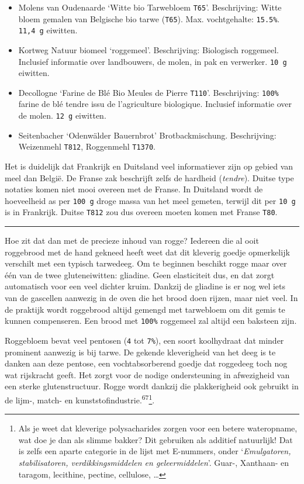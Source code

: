 \documentclass[
  11pt,
  dutch,
]{memoir}
\providecommand{\tightlist}{%
  \setlength{\itemsep}{0pt}\setlength{\parskip}{0pt}}
\begin{document}
\begin{itemize}
\tightlist
\item
  Molens van Oudenaarde `Witte bio Tarwebloem \texttt{T65}'.
  Beschrijving: Witte bloem gemalen van Belgische bio tarwe
  (\texttt{T65}). Max. vochtgehalte: \texttt{15.5\%}. \texttt{11,4\ g}
  eiwitten.
\item
  Kortweg Natuur biomeel `roggemeel'. Beschrijving: Biologisch
  roggemeel. Inclusief informatie over landbouwers, de molen, in pak en
  verwerker. \texttt{10\ g} eiwitten.
\item
  Decollogne `Farine de Blé Bio Meules de Pierre \texttt{T110}'.
  Beschrijving: \texttt{100\%} farine de blé tendre issu de
  l'agriculture biologique. Inclusief informatie over de molen.
  \texttt{12\ g} eiwitten.
\item
  Seitenbacher `Odenwälder Bauernbrot' Brotbackmischung. Beschrijving:
  Weizenmehl \texttt{T812}, Roggenmehl \texttt{T1370}.
\end{itemize}

Het is duidelijk dat Frankrijk en Duitsland veel informatiever zijn op
gebied van meel dan België. De Franse zak beschrijft zelfs de hardheid
(\emph{tendre}). Duitse type notaties komen niet mooi overeen met de
Franse. In Duitsland wordt de hoeveelheid as per \texttt{100\ g} droge
massa van het meel gemeten, terwijl dit per \texttt{10\ g} is in
Frankrijk. Duitse \texttt{T812} zou dus overeen moeten komen met Franse
\texttt{T80}.

\label{rogge}

\pfbreak

Hoe zit dat dan met de precieze inhoud van rogge? Iedereen die al ooit
roggebrood met de hand gekneed heeft weet dat dit kleverig goedje
opmerkelijk verschilt met een typisch tarwedeeg. Om te beginnen beschikt
rogge maar over één van de twee gluteneiwitten: gliadine. Geen
elasticiteit dus, en dat zorgt automatisch voor een veel dichter kruim.
Dankzij de gliadine is er nog wel iets van de gascellen aanwezig in de
oven die het brood doen rijzen, maar niet veel. In de praktijk wordt
roggebrood altijd gemengd met tarwebloem om dit gemis te kunnen
compenseren. Een brood met \texttt{100\%} roggemeel zal altijd een
baksteen zijn.

Roggebloem bevat veel pentosen (\texttt{4} tot \texttt{7\%}), een soort
koolhydraat dat minder prominent aanwezig is bij tarwe. De gekende
kleverigheid van het deeg is te danken aan deze pentose, een
vochtabsorberend goedje dat roggedeeg toch nog wat rijskracht geeft. Het
zorgt voor de nodige ondersteuning in afwezigheid van een sterke
glutenstructuur. Rogge wordt dankzij die plakkerigheid ook gebruikt in
de lijm-, match- en kunststofindustrie.\textsuperscript{67}\footnote{Als
  je weet dat kleverige polysacharides zorgen voor een betere
  wateropname, wat doe je dan als slimme bakker? Dit gebruiken als
  additief natuurlijk! Dat is zelfs een aparte categorie in de lijst met
  E-nummers, onder `\emph{Emulgatoren, stabilisatoren,
  verdikkingsmiddelen en geleermiddelen}'. Guar-, Xanthaan- en taragom,
  lecithine, pectine, cellulose, \ldots{}}.
\end{document}

